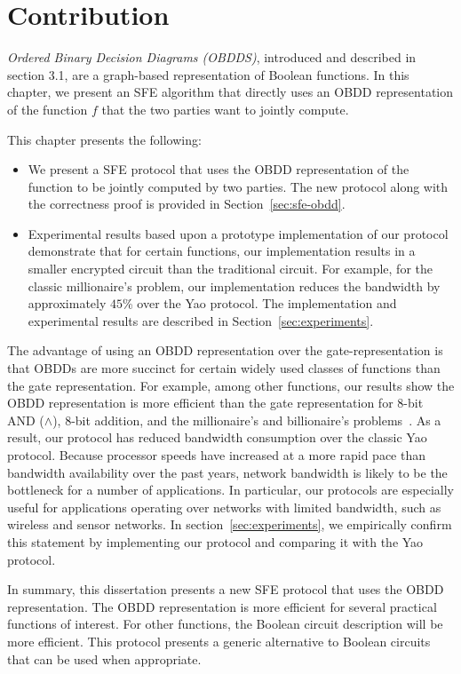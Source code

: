 \section{Contribution}
\label{sec:obdd-intro}



{\it Ordered Binary Decision Diagrams (OBDDS)}, introduced and
described in section 3.1, are a graph-based representation of Boolean
functions.  In this chapter, we present an
SFE algorithm that directly uses an OBDD representation of the
function $f$ that the two parties want to jointly compute. 

This chapter presents the following:
\begin{itemize}
\item We present a SFE protocol that uses the OBDD representation of
the function to be jointly computed by two parties. The new protocol along with the
correctness proof is provided in Section~\ref{sec:sfe-obdd}.

\item 
Experimental results based upon a prototype implementation of our
protocol demonstrate that for certain functions, our
implementation results in a smaller encrypted circuit than
the traditional circuit. For example, for the classic millionaire's problem, our
implementation reduces the bandwidth by approximately $45$\% over the Yao
protocol.  The
implementation and experimental results are described in
Section~\ref{sec:experiments}.
\end{itemize}

The
advantage of using an OBDD representation over the gate-representation
is that OBDDs are more succinct for certain widely used classes of
functions than the gate representation. For example, among other
functions, our results show the OBDD representation is more efficient
than the gate representation for 8-bit AND ($\wedge$), 8-bit addition, and the
millionaire's and billionaire's problems~\cite{Yao86}.  As a result,
our protocol has reduced bandwidth consumption over the classic Yao
protocol.  Because processor speeds have
increased at a more rapid pace than bandwidth availability over the
past years, network bandwidth is likely to be the bottleneck for a number of applications. In particular, our
protocols are especially useful for applications operating over
networks with limited bandwidth, such as wireless and sensor networks.
In section~\ref{sec:experiments}, we empirically confirm this statement by
implementing our protocol and comparing it with the Yao protocol.

In summary, this dissertation presents a new SFE protocol that uses the OBDD representation.
The OBDD representation is more efficient for several practical functions of 
interest. For other functions, the Boolean circuit description will be more 
efficient. This protocol presents a generic alternative to 
Boolean circuits that can be used when appropriate. 


